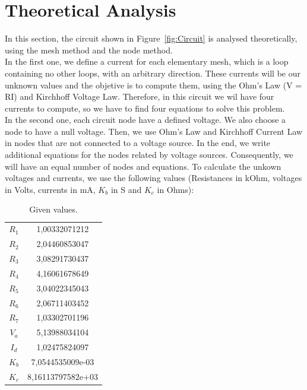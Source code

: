 \newpage
\section{Theoretical Analysis}
\label{sec:analysis}
In this section, the circuit shown in Figure~\ref{fig:Circuit} is analysed
theoretically, using the mesh method and the node method. \\
In the first one, we define a current for each elementary mesh, 
which is a loop containing no other loops, with an arbitrary direction.
These currents will be our unknown values and the objetive is to compute them, using the Ohm's Law (V = RI) and Kirchhoff Voltage Law. 
Therefore, in this circuit we wil have four currents to compute, so we have to find four equations to solve this problem. \\
\noindent In the second one, each circuit node have a defined voltage. We also choose a node to have a null voltage.
Then, we use Ohm's Law and Kirchhoff Current Law in nodes that are not connected to a voltage source.
In the end, we write additional equations for the nodes related by voltage sources.
Consequently, we will have an equal number of nodes and equations.
To calculate the unkown voltages and currents, we use the following values (Resistances in kOhm, voltages in Volts, currents in mA, $K_b$ in S and $K_c$ in Ohms):
\begin{table}[h!]
\centering
\begin{small}
\caption{Given values.} \label{Table1}
\begin{tabular}{c|c}
\hline
$R_1$ & 1,00332071212 \\
$R_2$  & 2,04460853047 \\
$R_3$  & 3,08291730437 \\
$R_4$ & 4,16061678649 \\
$R_5$  & 3,04022345043 \\
$R_6$ & 2,06711403452 \\
$R_7$ & 1,03302701196 \\
$V_a$ & 5,13988034104\\
$I_d$ & 1,02475824097 \\
$K_b$ & 7,0544535009e-03 \\
$K_c$ & 8,16113797582e+03\\
\hline
\end{tabular}
\end{small}
\end{table}

\newpage

